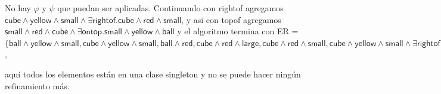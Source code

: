 No hay
$\varphi$ y $\psi$ que puedan ser aplicadas. Continuando con \textsf{rightof} agregamos $\textsf{cube} \wedge \textsf{yellow} \wedge \textsf{small} \wedge \exists \textsf{rightof}. \textsf{cube} \wedge \textsf{red} \wedge \textsf{small}$, y asi con \textsf{topof} agregamos $\textsf{small} \wedge \textsf{red} \wedge \textsf{cube} \wedge \exists \textsf{ontop}. \textsf{small} \wedge \textsf{yellow} \wedge \textsf{ball}$ y el algoritmo termina con ER = $\{\textsf{ball} \wedge \textsf{yellow} \wedge \textsf{small}, \textsf{cube} \wedge \textsf{yellow} \wedge \textsf{small}, \textsf{ball} \wedge \textsf{red}, \textsf{cube} \wedge \textsf{red} \wedge \textsf{large}, \textsf{cube} \wedge \textsf{red} \wedge \textsf{small}, \textsf{cube} \wedge \textsf{yellow} \wedge \textsf{small} \wedge \exists \textsf{rightof}. \textsf{cube} \wedge \textsf{red} \wedge \textsf{small}, \textsf{small} \wedge \textsf{red} \wedge \textsf{cube} \wedge \exists \textsf{ontop}. \textsf{small} \wedge \textsf{yellow} \wedge \textsf{ball}\}$, %

aqu\'i todos los elementos est\'an en una clase singleton y no se puede hacer
ning\'un refinamiento m\'as. 


